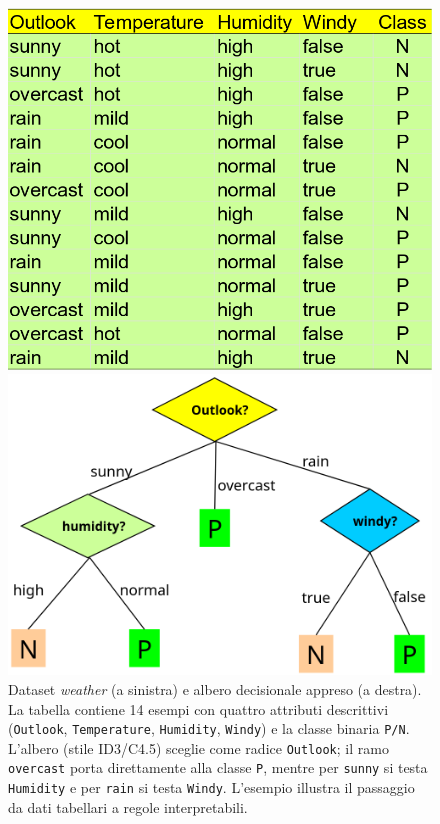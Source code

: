 \begin{figure}[htbp]
  \centering
  \begin{minipage}[t]{.50\textwidth}
    \centering
    \includegraphics[width=\linewidth]{images/weather_table.png}
  \end{minipage}\hfill
  \begin{minipage}[t]{.48\textwidth}
    \centering
    \includegraphics[width=\linewidth]{images/decision_tree_weather.png}
  \end{minipage}
  \caption{Dataset \emph{weather} (a sinistra) e albero decisionale appreso (a destra). 
  La tabella contiene 14 esempi con quattro attributi descrittivi (\texttt{Outlook}, \texttt{Temperature}, 
  \texttt{Humidity}, \texttt{Windy}) e la classe binaria \texttt{P/N}. 
  L’albero (stile ID3/C4.5) sceglie come radice \texttt{Outlook}; il ramo \texttt{overcast} porta 
  direttamente alla classe \texttt{P}, mentre per \texttt{sunny} si testa \texttt{Humidity} e per \texttt{rain} 
  si testa \texttt{Windy}. L’esempio illustra il passaggio da dati tabellari a regole interpretabili.}
  \label{fig:weather-tree}
\end{figure}


